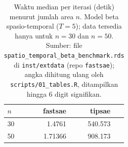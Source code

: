 \begin{table}[htbp]
\centering
\caption{Waktu median per iterasi (detik) menurut jumlah area $n$. Model beta spasio-temporal ($T=5$); data tersedia hanya untuk $n=30$ dan $n=50$. Sumber: file \texttt{spatio\_temporal\_beta\_benchmark.rds} di \texttt{inst/extdata} (repo \texttt{fastsae}); angka dihitung ulang oleh \texttt{scripts/01\_tables.R}, ditampilkan hingga 6 digit signifikan.}
\label{tab:time-stbeta}
\small
\begin{tabular}{lrrr}
\toprule
$n$ & fastsae & tipsae \\
\midrule
30 &  1.4761 & 540.573 \\
50 & 1.71366 & 908.173 \\
\bottomrule
\end{tabular}
\end{table}

